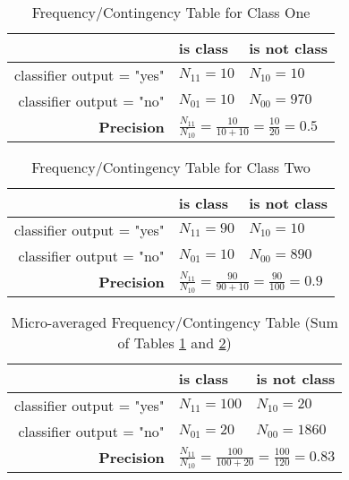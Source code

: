 \documentclass{article}
\begin{document}
\begin{table}[H]
	\centering
	\begin{tabular}{|r|l|l|}
		\hline
		& is class & is not class \\
		\hline
		classifier output = "yes" & $N_{11} = 10$ & $N_{10} = 10$ \\
		classifier output = "no" & $N_{01} = 10$ & $N_{00} = 970$ \\
		\hline
		\textbf{Precision} & \multicolumn{2}{l|}{
			$\frac{N_{11}}{N_{10}} = \frac{10}{10 + 10} = \frac{10}{20} = 0.5$
		} \\
		\hline
	\end{tabular}
	\caption{Frequency/Contingency Table for Class One}
	\label{tab:multiclass-eval-class1}
\end{table}

\begin{table}[H]
	\centering
	\begin{tabular}{|r|l|l|}
		\hline
		& is class & is not class \\
		\hline
		classifier output = "yes" & $N_{11} = 90$ & $N_{10} = 10$ \\
		classifier output = "no" & $N_{01} = 10$ & $N_{00} = 890$ \\
		\hline
		\textbf{Precision} & \multicolumn{2}{l|}{
			$\frac{N_{11}}{N_{10}} = \frac{90}{90 + 10} = \frac{90}{100} = 0.9$
		} \\
		\hline
	\end{tabular}
	\caption{Frequency/Contingency Table for Class Two}
	\label{tab:multiclass-eval-class2}
\end{table}

\begin{table}[H]
	\centering
	\begin{tabular}{|r|l|l|}
		\hline
		& is class & is not class \\
		\hline
		classifier output = "yes" & $N_{11} = 100$ & $N_{10} = 20$ \\
		classifier output = "no" & $N_{01} = 20$ & $N_{00} = 1860$ \\
		\hline
		\textbf{Precision} & \multicolumn{2}{l|}{
			$\frac{N_{11}}{N_{10}} = \frac{100}{100 + 20} = \frac{100}{120} = 0.83$
		} \\
		\hline
	\end{tabular}
	\caption{Micro-averaged Frequency/Contingency Table (Sum of Tables \ref {tab:multiclass-eval-class1} and \ref{tab:multiclass-eval-class2})}
	\label{tab:multiclass-eval-classsum}
\end{table}
\end{document}
